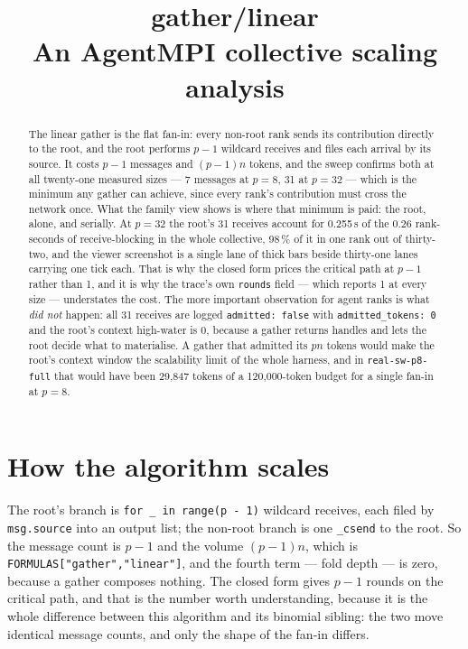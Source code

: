 \documentclass[11pt]{article}
\title{\textbf{gather/linear}\\[2pt]\large An AgentMPI collective scaling analysis}
\author{}
\date{}
\begin{document}
\maketitle

\begin{abstract}
The linear gather is the flat fan-in: every non-root rank sends its contribution directly to the
root, and the root performs $p-1$ wildcard receives and files each arrival by its source. It
costs $p-1$ messages and $(p-1)n$ tokens, and the sweep confirms both at all twenty-one measured
sizes --- 7 messages at $p=8$, 31 at $p=32$ --- which is the minimum any gather can achieve,
since every rank's contribution must cross the network once. What the family view shows is where
that minimum is paid: the root, alone, and serially. At $p=32$ the root's 31 receives account for
0.255\,s of the 0.26 rank-seconds of receive-blocking in the whole collective, 98\,\% of it in one
rank out of thirty-two, and the viewer screenshot is a single lane of thick bars beside
thirty-one lanes carrying one tick each. That is why the closed form prices the critical path at
$p-1$ rather than 1, and it is why the trace's own \texttt{rounds} field --- which reports 1 at
every size --- understates the cost. The more important observation for agent ranks is what
\emph{did not} happen: all 31 receives are logged \texttt{admitted: false} with
\texttt{admitted\_tokens: 0} and the root's context high-water is 0, because a gather returns
handles and lets the root decide what to materialise. A gather that admitted its $pn$ tokens
would make the root's context window the scalability limit of the whole harness, and in
\texttt{real-sw-p8-full} that would have been 29,847 tokens of a 120,000-token budget for a
single fan-in at $p=8$.
\end{abstract}



\section{How the algorithm scales}

The root's branch is \texttt{for \_ in range(p - 1)} wildcard receives, each filed by
\texttt{msg.source} into an output list; the non-root branch is one \texttt{\_csend} to the root.
So the message count is $p-1$ and the volume $(p-1)n$, which is
\texttt{FORMULAS["gather","linear"]}, and the fourth term --- fold depth --- is zero, because a
gather composes nothing. The closed form gives $p-1$ rounds on the critical path, and that is the
number worth understanding, because it is the whole difference between this algorithm and its
binomial sibling: the two move identical message counts, and only the shape of the fan-in
differs.
\end{document}
